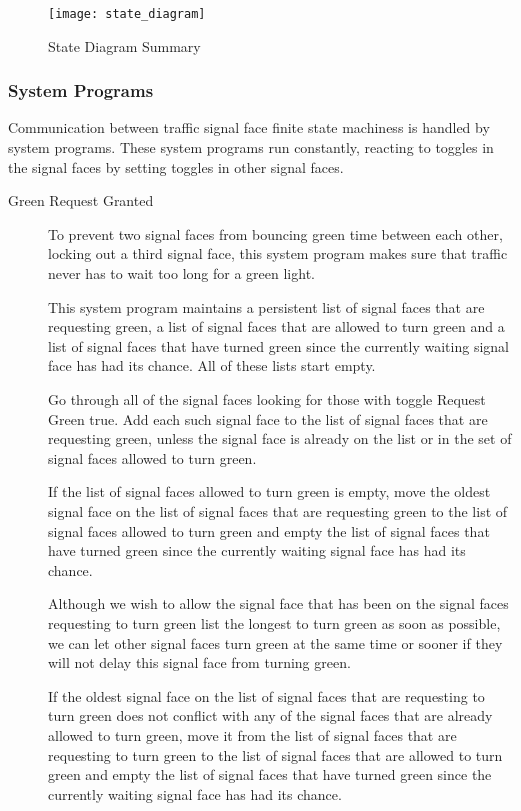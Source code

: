 \documentclass[letterpaper,twoside]{article}
\begin{document}
\begin{figure}[htb]
  {\texttt{[image: state\_diagram]}}
  {\caption{State Diagram Summary}\label{fig:State_Diagram_Summary}}
\end{figure}

\subsubsection{System Programs}

Communication between traffic signal face finite state machiness is handled by
system programs.
These system programs run constantly, reacting to toggles in the
signal faces by setting toggles in other signal faces.

\begin{description}
\item [Green Request Granted]

To prevent two signal faces from bouncing green time between each other,
locking out a third signal face, this system program makes sure that
traffic never has to wait too long for a green light.

This system program maintains a persistent list of signal faces that are
requesting green,
a list of signal faces that are allowed to turn green and a list of signal
faces that have turned green since the currently waiting signal face
has had its chance.
All of these lists start empty.

Go through all of the signal faces looking for those with toggle Request
Green true.  Add each such signal face to the list of
signal faces that are requesting green, unless the signal face is already on
the list or in the set of signal faces allowed to turn green.

If the list of signal faces allowed to turn green is empty, move the
oldest signal face on the list of signal faces that are requesting
green to the list of signal faces allowed to turn green and empty the list
of signal faces that have turned green since the currently waiting
signal face has had its chance.

Although we wish to allow the signal face that has been on the
signal faces requesting to turn green list the longest to turn green
as soon as possible, we can let other signal faces turn green
at the same time or sooner if they will not delay this signal face
from turning green.

If the oldest signal face on the list of signal faces that are
requesting to turn green does not conflict with any of the signal
faces that are already allowed to turn green, move it from the
list of signal faces that are requesting to turn green to the list
of signal faces that are allowed to turn green and empty the list
of signal faces that have turned green since the currently waiting
signal face has had its chance.


\end{description}
\end{document}
